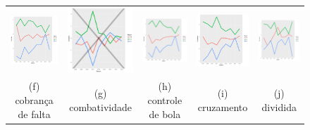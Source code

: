 \documentclass[doc,apacite,oneside,a4paper,12pt]{apa6}
\begin{document}
\begin{figure}
\begin{tabular}{ccccc}
\includegraphics[width=25mm]{cobr_falta_result} & \includegraphics[width=25mm]{combativ__result} &   \includegraphics[width=25mm]{contr_bola_result} &
  \includegraphics[width=25mm]{cruzamento_result} & \includegraphics[width=25mm]{div_empe_result} \\
 \scriptsize{(f) cobrança de falta } & \scriptsize{(g) combatividade } & \scriptsize{(h) controle de bola} & \scriptsize{(i) cruzamento} & \scriptsize{(j) dividida}\\[3pt]
 

\end{tabular}
\end{figure}
\end{document}
